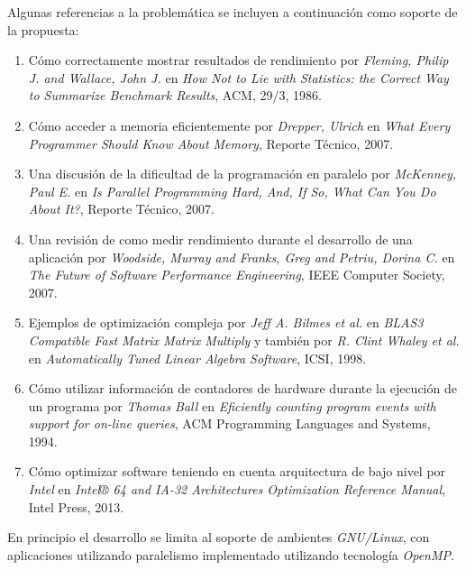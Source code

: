 \documentclass[a4paper]{article}
\begin{document}
\bigskip

Algunas referencias a la problemática se incluyen a continuación como soporte de la propuesta:

\begin{enumerate}

\item Cómo correctamente mostrar resultados de rendimiento por {\it Fleming, Philip J. and Wallace, John J.} en {\it How Not to Lie with Statistics: the Correct Way to Summarize Benchmark Results}, {ACM}, {29/3}, {1986}.

\item Cómo acceder a memoria eficientemente por {\it Drepper, Ulrich} en {\it What Every Programmer Should Know About Memory}, Reporte Técnico, 2007.

\item Una discusión de la dificultad de la programación en paralelo por {\it McKenney, Paul E.} en {\it Is Parallel Programming Hard, And, If So, What Can You Do About It?}, Reporte Técnico, 2007.

\item Una revisión de como medir rendimiento durante el desarrollo de una aplicación por {\it Woodside, Murray and Franks, Greg and Petriu, Dorina C.} en {\it The Future of Software Performance Engineering}, IEEE Computer Society, 2007.

\item Ejemplos de optimización compleja por {\it Jeff A. Bilmes et al.} en {\it BLAS3 Compatible Fast Matrix Matrix Multiply} y también por {\it R. Clint Whaley et al.} en {\it Automatically Tuned Linear Algebra Software}, ICSI, 1998.

\item Cómo utilizar información de contadores de hardware durante la ejecución de un programa por {\it Thomas Ball} en {\it Eficiently counting program events with support for on-line queries}, ACM Programming Languages and Systems, 1994.

\item Cómo optimizar software teniendo en cuenta arquitectura de bajo nivel por {\it Intel} en {\it Intel® 64 and IA-32 Architectures Optimization Reference Manual}, Intel Press, 2013.

\end{enumerate}

En principio el desarrollo se limita al soporte de ambientes {\it GNU/Linux}, con aplicaciones utilizando paralelismo implementado utilizando tecnología {\it OpenMP}.
\end{document}
